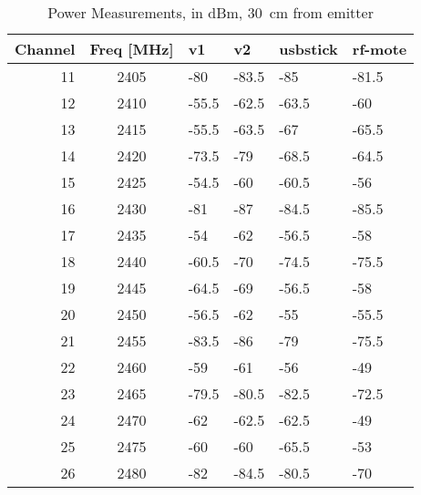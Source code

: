 \begin{table}
  \myfloatalign
  \begin{tabularx}{\textwidth}{r|c|X|X|X|X}
        Channel  & Freq [MHz] & v1    & v2    & usbstick & rf-mote \\ \hline
        11       & 2405       & -80   & -83.5 & -85      & -81.5   \\ 
        12       & 2410       & -55.5 & -62.5 & -63.5    & -60     \\ 
        13       & 2415       & -55.5 & -63.5 & -67      & -65.5   \\ 
        14       & 2420       & -73.5 & -79   & -68.5    & -64.5   \\ 
        15       & 2425       & -54.5 & -60   & -60.5    & -56     \\ 
        16       & 2430       & -81   & -87   & -84.5    & -85.5   \\ 
        17       & 2435       & -54   & -62   & -56.5    & -58     \\ 
        18       & 2440       & -60.5 & -70   & -74.5    & -75.5   \\ 
        19       & 2445       & -64.5 & -69   & -56.5    & -58     \\ 
        20       & 2450       & -56.5 & -62   & -55      & -55.5   \\ 
        21       & 2455       & -83.5 & -86   & -79      & -75.5   \\ 
        22       & 2460       & -59   & -61   & -56      & -49     \\ 
        23       & 2465       & -79.5 & -80.5 & -82.5    & -72.5   \\ 
        24       & 2470       & -62   & -62.5 & -62.5    & -49     \\ 
        25       & 2475       & -60   & -60   & -65.5    & -53     \\ 
        26       & 2480       & -82   & -84.5 & -80.5    & -70     \\
    \end{tabularx}
    \caption[Power Measurements at \SI{30}{cm}]{Power Measurements, in dBm,
    \SI{30}{cm} from emitter}
    \label{tab:power-30cm}
\end{table}


